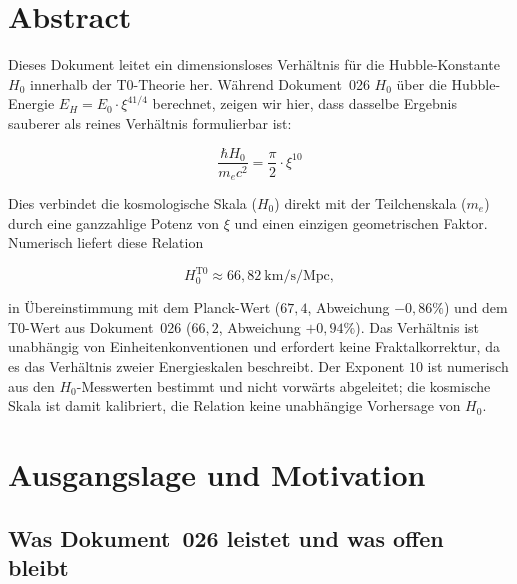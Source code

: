 
\section*{Abstract}

Dieses Dokument leitet ein dimensionsloses Verhältnis für die Hubble-Konstante
$H_0$ innerhalb der T0-Theorie her. Während Dokument~026 $H_0$ über die
Hubble-Energie $E_H = E_0 \cdot \xi^{41/4}$ berechnet, zeigen wir hier,
dass dasselbe Ergebnis sauberer als reines Verhältnis formulierbar ist:

\begin{equation}
    \boxed{\frac{\hbar H_0}{m_e c^2} = \frac{\pi}{2} \cdot \xi^{10}}
    \label{eq:h0_ratio_main}
\end{equation}

Dies verbindet die kosmologische Skala ($H_0$) direkt mit der Teilchenskala
($m_e$) durch eine ganzzahlige Potenz von $\xi$ und einen einzigen
geometrischen Faktor. Numerisch liefert diese Relation

\[
H_0^{\text{T0}} \approx 66{,}82 \ \text{km/s/Mpc},
\]

in Übereinstimmung mit dem Planck-Wert ($67{,}4$, Abweichung $-0{,}86\%$) und dem
T0-Wert aus Dokument~026 ($66{,}2$, Abweichung $+0{,}94\%$). Das Verhältnis
ist unabhängig von Einheitenkonventionen und erfordert keine Fraktalkorrektur,
da es das Verhältnis zweier Energieskalen beschreibt. Der Exponent $10$ ist
numerisch aus den $H_0$-Messwerten bestimmt und nicht vorwärts abgeleitet; die
kosmische Skala ist damit kalibriert, die Relation keine unabhängige Vorhersage
von $H_0$.

\clearpage

\section{Ausgangslage und Motivation}
\label{sec:motivation}

\subsection{Was Dokument~026 leistet und was offen bleibt}

